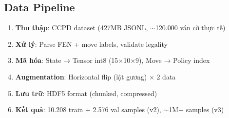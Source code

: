 \subsection{Data Pipeline}
\begin{enumerate}
    \item \textbf{Thu thập}: CCPD dataset (427MB JSONL, $\sim$120.000 ván cờ thực tế)
    \item \textbf{Xử lý}: Parse FEN + move labels, validate legality
    \item \textbf{Mã hóa}: State → Tensor int8 (15×10×9), Move → Policy index
    \item \textbf{Augmentation}: Horizontal flip (lật gương) × 2 data
    \item \textbf{Lưu trữ}: HDF5 format (chunked, compressed)
    \item \textbf{Kết quả}: 10.208 train + 2.576 val samples (v2), $\sim$1M+ samples (v3)
\end{enumerate}
